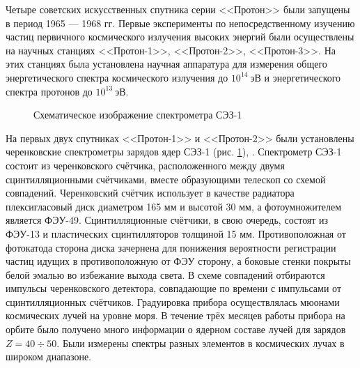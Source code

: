 \documentclass[12pt,a4paper]{report} %
\begin{document}
Четыре советских искусственных спутника серии <<Протон>> были запущены в период 1965 --- 1968 гг.
Первые эксперименты по непосредственному изучению частиц первичного космического излучения высоких энергий были осуществлены на научных станциях <<Протон-1>>, <<Протон-2>>, <<Протон-3>>. На этих станциях была установлена научная аппаратура для измерения общего энергетического спектра космического излучения до $10^{14}~эВ$ и энергетического спектра протонов до $10^{13}~эВ$.
\begin{figure}[th]
	\noindent{}
	\caption{Схематическое изображение спектрометра СЭЗ-1}
	\label{figSEZ1}
\end{figure}
На первых двух спутниках <<Протон-1>> и <<Протон-2>> были установлены черенковские спектрометры зарядов ядер СЭЗ-1 (рис. \ref{figSEZ1}), \cite{SEZ1}. Спектрометр СЭЗ-1 состоит из черенковского счётчика, расположенного между двумя сцинтилляционными счётчиками, вместе образующими телескоп со схемой совпадений.
Черенковский счётчик использует в качестве радиатора плексигласовый диск диаметром 165 мм и высотой 30 мм, а фотоумножителем является ФЭУ-49. 
Сцинтилляционные счётчики, в свою очередь, состоят из ФЭУ-13 и пластических сцинтилляторов толщиной 15 мм. 
Противоположная от фотокатода сторона диска зачернена для понижения вероятности регистрации частиц идущих в противоположную от ФЭУ сторону, а боковые стенки покрыты белой эмалью во избежание выхода света. 
В схеме совпадений отбираются импульсы черенковского детектора, совпадающие по времени с импульсами от сцинтилляционных счётчиков. 
Градуировка прибора осуществлялась мюонами космических лучей на уровне моря. 
В течение трёх месяцев работы прибора на орбите было получено много информации о ядерном составе лучей для зарядов $Z=40\div50$. Были измерены спектры разных элементов в космических лучах в широком диапазоне. 
\end{document}
